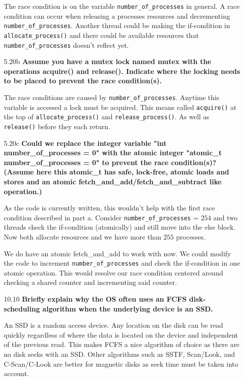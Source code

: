 \documentclass[11pt, letterpaper]{hw}
\begin{document}
\begin{enumerate}
The race condition is on the variable {\tt number\_of\_processes} in general. A race condition can occur when releasing a processes resources and decrementing {\tt number\_of\_processes}. Another thread could be making the if-condition in {\tt allocate\_process()} and there could be available resources that {\tt number\_of\_processes} doesn't reflect yet.
 
\item [5.20b] \textbf{Assume you have a mutex lock named mutex with the operations acquire() and release(). Indicate where the locking needs to be placed to prevent the race condition(s).}

The race conditions are caused by {\tt number\_of\_processes}. Anytime this variable is accessed a lock must be acquired. This means called {\tt acquire()} at the top of {\tt allocate\_process()} and {\tt release\_process()}. As well as {\tt release()} before they each return.

\item [5.20c] \textbf{Could we replace the integer variable "int number\_of\_processes = 0" with the atomic integer "atomic\_t number\_of\_processes = 0" to prevent the race condition(s)? (Assume here this atomic\_t has safe, lock-free, atomic loads and stores and an atomic fetch\_and\_add/fetch\_and\_subtract like operation.)}

As the code is currently written, this wouldn't help with the first race condition described in part a. Consider {\tt number\_of\_processes} = $254$ and two threads check the if-condition (atomically) and still move into the else block. Now both allocate resources and we have more than $255$ processes.

We do have an atomic fetch\_and\_add to work with now. We could modify the code to increment {\tt number\_of\_processes} and check the if-condition in one atomic operation. This would resolve our race condition centered around checking a shared counter and incrementing said counter.

\item [10.10] \textbf{Briefly explain why the OS often uses an FCFS disk-scheduling algorithm when the underlying device is an SSD.}

An SSD is a random access device. Any location on the disk can be read quickly regardless of where the data is located on the device and independent of the previous read. This makes FCFS a nice algorithm of choice as there are no disk seeks with an SSD. Other algorithms such as SSTF, Scan/Look, and C-Scan/C-Look are better for magnetic disks as seek time must be taken into account.


\end{enumerate}
\end{document}
